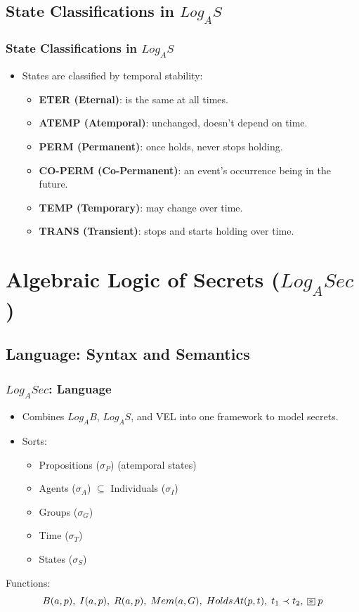 \documentclass[aspectratio=169]{beamer}
\newcommand{\BoxStar}{\fboxsep=1pt\fbox{$\ast$}}
\begin{document}
\subsection{State Classifications in $Log_AS$}
\begin{frame}
\frametitle{State Classifications in $Log_AS$}
\Large
\begin{itemize}
    \item States are classified by temporal stability:
    \begin{itemize}
        \Large 
        \item \textbf{ETER (Eternal)}: is the same at all times.
        \item \textbf{ATEMP (Atemporal)}: unchanged, doesn't depend on time.
        \item \textbf{PERM (Permanent)}: once holds, never stops holding.
        \item \textbf{CO-PERM (Co-Permanent)}: an event's occurrence being in the future.
        \item \textbf{TEMP (Temporary)}: may change over time.
        \item \textbf{TRANS (Transient)}: stops and starts holding over time.
    \end{itemize}
\end{itemize}
\end{frame}


\section{Algebraic Logic of Secrets ($Log_ASec$)}

\subsection{Language: Syntax and Semantics}
\begin{frame}
\frametitle{$Log_ASec$: Language}
\begin{itemize}
    \item Combines $Log_AB$, $Log_AS$, and VEL into one framework to model secrets.
    \item Sorts:
    \begin{itemize}
        \item Propositions ($\sigma_P$) (atemporal states)
        \item Agents ($\sigma_A$) $\subseteq$ Individuals ($\sigma_I$)
        \item Groups ($\sigma_G$)
        \item Time ($\sigma_T$)
        \item States ($\sigma_S$)
    \end{itemize}
\end{itemize}
\begin{block}{Functions:}
\[
B(a, p), \; I(a, p), \; R(a, p), \;
Mem(a, G), \; HoldsAt(p, t), \; t_1 \prec t_2, \; \BoxStar \; p
\]
\end{block}
\end{frame}
\end{document}
